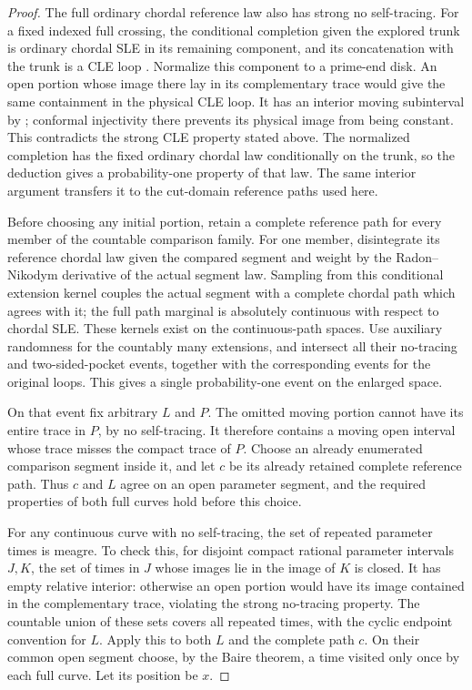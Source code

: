 \documentclass[11pt]{article}
\numberwithin{equation}{section}
\theoremstyle{definition}
\theoremstyle{remark}
\newcommand{\1}{\mathbf 1}
\begin{document}
\begin{proof}
The full ordinary chordal reference law also has strong no self-tracing.
For a fixed indexed full crossing, the conditional completion given
the explored trunk is ordinary chordal SLE in its remaining component,
and its concatenation with the trunk is a CLE loop
\cite[Section~2.3.2]{GwynneMillerQianCLE}.
Normalize this component to a prime-end disk.  An open portion whose
image there lay in its complementary trace would give the same
containment in the physical CLE loop.  It has an interior moving
subinterval by \cite[Proposition~1.7]{YuanLoewnerTraces}; conformal
injectivity there prevents its physical image from being constant.
This contradicts the strong CLE property stated above.  The normalized
completion has the fixed ordinary chordal law conditionally on the
trunk, so the deduction gives a probability-one property of that law.
The same interior argument transfers it to the cut-domain reference
paths used here.

Before choosing any initial portion, retain a complete reference path
for every member of the countable comparison family.  For one member,
disintegrate its reference chordal law given the compared segment and
weight by the Radon--Nikodym derivative of the actual segment law.
Sampling from this conditional extension kernel couples the actual
segment with a complete chordal path which agrees with it; the full
path marginal is absolutely continuous with respect to chordal SLE.
These kernels exist on the continuous-path spaces.  Use auxiliary
randomness for the countably many extensions, and intersect all their
no-tracing and two-sided-pocket events, together with the corresponding
events for the original loops.  This gives a single probability-one
event on the enlarged space.

On that event fix arbitrary $L$ and $P$.  The omitted moving portion
cannot have its entire trace in $P$, by no self-tracing.  It therefore
contains a moving open interval whose trace misses the compact trace
of $P$.  Choose an already enumerated comparison segment inside it,
and let $c$ be its already retained complete reference path.  Thus $c$
and $L$ agree on an open parameter segment, and the required properties
of both full curves hold before this choice.

For any continuous curve with no self-tracing, the set of repeated
parameter times is meagre.  To check this, for disjoint compact rational
parameter intervals $J,K$, the set of times in $J$ whose images lie in
the image of $K$ is closed.  It has empty relative interior: otherwise
an open portion would have its image contained in the complementary trace, violating
the strong no-tracing property.  The countable union of
these sets covers all repeated times, with the cyclic endpoint
convention for $L$.  Apply this to both $L$ and the complete path $c$.
On their common open segment choose, by the Baire theorem, a time
visited only once by each full curve.  Let its position be $x$.


\end{proof}
\end{document}
